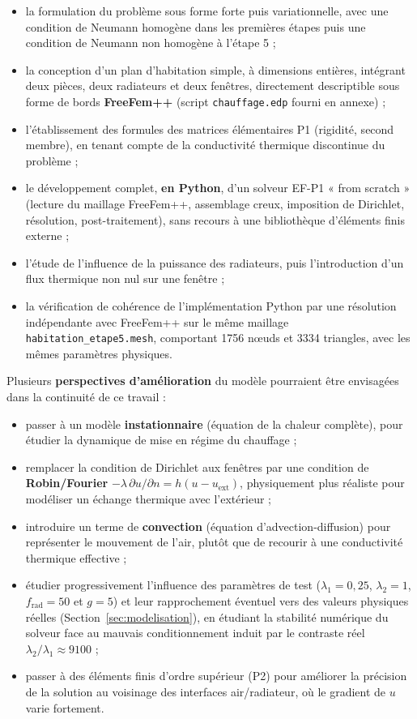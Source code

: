 \documentclass[12pt,a4paper]{article}
\begin{document}
	\begin{itemize}
		\item la formulation du problème sous forme forte puis variationnelle,
		avec une condition de Neumann homogène dans les premières étapes puis une
		condition de Neumann non homogène à l'étape 5 ;
		\item la conception d'un plan d'habitation simple, à dimensions entières, intégrant deux pièces, deux radiateurs et deux fenêtres, directement descriptible sous forme de bords \textbf{FreeFem++} (script \texttt{chauffage.edp} fourni en annexe) ;
		\item l'établissement des formules des matrices élémentaires P1 (rigidité, second membre), en tenant compte de la conductivité thermique discontinue du problème ;
		\item le développement complet, \textbf{en Python}, d'un solveur EF-P1 « from scratch » (lecture du maillage FreeFem++, assemblage creux, imposition de Dirichlet, résolution, post-traitement), sans recours à une bibliothèque d'éléments finis externe ;
		\item l'étude de l'influence de la puissance des radiateurs, puis
		l'introduction d'un flux thermique non nul sur une fenêtre ; 
		\item la vérification de cohérence de l'implémentation Python par une
		résolution indépendante avec FreeFem++ sur le même maillage
		\texttt{habitation\_etape5.mesh}, comportant 1756 nœuds et 3334 triangles,
		avec les mêmes paramètres physiques.
	\end{itemize}
	
	Plusieurs \textbf{perspectives d'amélioration} du modèle pourraient être envisagées dans la continuité de ce travail :
	\begin{itemize}
		\item passer à un modèle \textbf{instationnaire} (équation de la chaleur complète), pour étudier la dynamique de mise en régime du chauffage ;
		\item remplacer la condition de Dirichlet aux fenêtres par une condition de \textbf{Robin/Fourier} $-\lambda\,\partial u/\partial n = h(u - u_{\text{ext}})$, physiquement plus réaliste pour modéliser un échange thermique avec l'extérieur ;
		\item introduire un terme de \textbf{convection} (équation d'advection-diffusion) pour représenter le mouvement de l'air, plutôt que de recourir à une conductivité thermique effective ;
		\item étudier progressivement l'influence des paramètres de test
		($\lambda_1=0{,}25$, $\lambda_2=1$, $f_{\mathrm{rad}}=50$ et $g=5$) et
		leur rapprochement éventuel vers des valeurs physiques réelles (Section~\ref{sec:modelisation}), en étudiant la stabilité numérique du solveur face au mauvais conditionnement induit par le contraste réel $\lambda_2/\lambda_1 \approx 9100$ ;
		\item passer à des éléments finis d'ordre supérieur (P2) pour améliorer la précision de la solution au voisinage des interfaces air/radiateur, où le gradient de $u$ varie fortement.
	\end{itemize}
	
\end{document}
